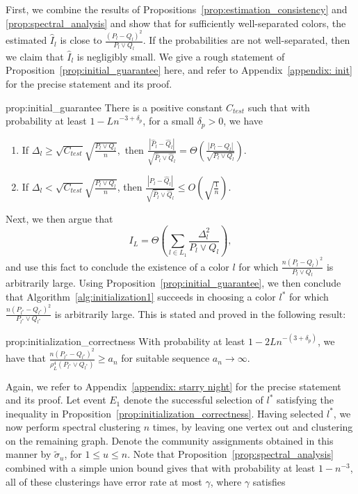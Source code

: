 \documentclass{article}
\begin{document}
First,  we combine the results of Propositions~\ref{prop:estimation_consistency} and \ref{prop:spectral_analysis} and show that for sufficiently well-separated colors, the estimated $\hat I_l$ is close to $\frac{( P_l -  Q_l)^2}{P_l \vee Q_l}$. If the probabilities are not well-separated, then we claim that $\hat I_l$ is negligibly small. We give a rough statement of Proposition~\ref{prop:initial_guarantee} here, and refer to Appendix~\ref{appendix: init} for the precise statement and its proof.
\begin{repproposition} {prop:initial_guarantee}
There is a positive constant $C_{test}$ such that with probability at least $1 - Ln^{-3 + \delta_p}$, for a small $\delta_p > 0$, we have
\begin{enumerate} 
\item If $\Delta_l \geq \sqrt{C_{test}} \sqrt{ \frac{P_l \vee Q_l}{n}},$ then $\frac{ | \hat{P}_l - \hat{Q}_l| }{\sqrt{ \hat{P}_l \vee \hat{Q}_l }} = \Theta \left(\frac{ | P_l - Q_l | }{\sqrt{ P_l \vee Q_l}} \right).$
\item If $\Delta_l <  \sqrt{C_{test}} \sqrt{ \frac{P_l \vee Q_l}{n} }$, then
$\frac{ | \hat{P}_l - \hat{Q}_l|}{\sqrt{ \hat{P}_l \vee \hat{Q}_l}} \leq O\left( \sqrt{ \frac{1}{n} } \right).$ 
\end{enumerate}
\end{repproposition}
Next, we then argue that 
$$I_L = \Theta\left( \sum_{l \in L_1} \frac{\Delta_l^2} {P_l \vee Q_l} \right),$$
and use this fact to conclude the existence of a color $l$ for which $\frac{n( P_l -  Q_l)^2}{P_l \vee Q_l}$ is arbitrarily large. Using Proposition~\ref{prop:initial_guarantee}, we then conclude that Algorithm~\ref{alg:initialization1}  succeeds in choosing a color $l^*$ for which $\frac{n( P_{l^*} -  Q_{l^*})^2}{P_{l^*} \vee Q_{l^*}}$ is arbitrarily large. This is stated and proved in the following result:
\begin{repproposition}{prop:initialization_correctness}
With probability at least $1 - 2L n^{-(3+\delta_p)}$, we have that $\frac{n (P_{l^*}-Q_{l^*})^2}{\rho_L^4(P_{l^*} \vee Q_{l^*})} \geq a_n$ for suitable sequence $a_n \to \infty$. 
\end{repproposition}
Again, we refer to Appendix~\ref{appendix: starry night} for the precise statement and its proof. Let event $E_1$ denote the successful selection of $l^*$ satisfying the inequality in Proposition~\ref{prop:initialization_correctness}. Having selected $l^*$, we now perform spectral clustering $n$ times, by leaving one vertex out and clustering on the remaining graph. Denote the community assignments obtained in this manner by $\tilde \sigma_u$, for $1 \leq u \leq n$. Note that Proposition~\ref{prop:spectral_analysis} combined with a simple union bound gives that with probability at least $1-n^{-3}$, all of these clusterings have error rate at most $\gamma$, where $\gamma$ satisfies
\end{document}
